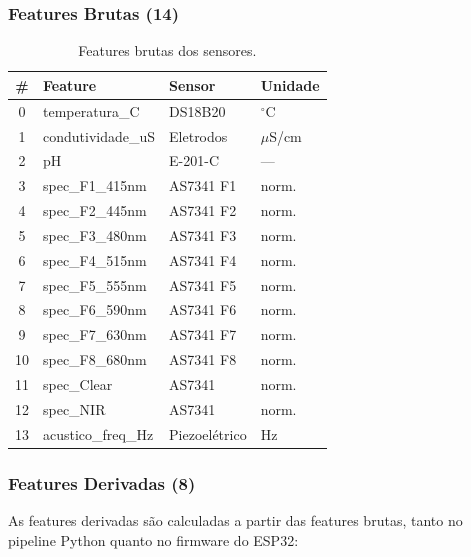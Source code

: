 \documentclass[12pt, a4paper]{article}
\begin{document}
\subsubsection{Features Brutas (14)}

\begin{table}[H]
  \centering
  \caption{Features brutas dos sensores.}
  \begin{tabular}{clll}
    \toprule
    \textbf{\#} & \textbf{Feature} & \textbf{Sensor} & \textbf{Unidade} \\
    \midrule
    0  & temperatura\_C        & DS18B20    & $^\circ$C \\
    1  & condutividade\_uS     & Eletrodos  & $\mu$S/cm \\
    2  & pH                    & E-201-C    & --- \\
    3  & spec\_F1\_415nm        & AS7341 F1  & norm. \\
    4  & spec\_F2\_445nm        & AS7341 F2  & norm. \\
    5  & spec\_F3\_480nm        & AS7341 F3  & norm. \\
    6  & spec\_F4\_515nm        & AS7341 F4  & norm. \\
    7  & spec\_F5\_555nm        & AS7341 F5  & norm. \\
    8  & spec\_F6\_590nm        & AS7341 F6  & norm. \\
    9  & spec\_F7\_630nm        & AS7341 F7  & norm. \\
    10 & spec\_F8\_680nm        & AS7341 F8  & norm. \\
    11 & spec\_Clear            & AS7341     & norm. \\
    12 & spec\_NIR              & AS7341     & norm. \\
    13 & acustico\_freq\_Hz     & Piezoel\'{e}trico & Hz \\
    \bottomrule
  \end{tabular}
\end{table}

\subsubsection{Features Derivadas (8)}

As features derivadas s\~{a}o calculadas a partir das features brutas, tanto no pipeline Python quanto no firmware do ESP32:
\end{document}

